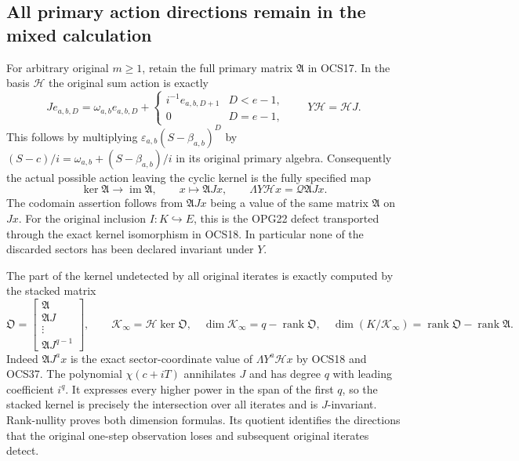 \documentclass[11pt,a4paper]{article}
\begin{document}
\subsection{All primary action directions remain in the mixed calculation}
For arbitrary original $m\geq1$, retain the full primary
matrix $\mathfrak A$ in OCS17. In the basis $\mathcal H$
the original sum action is exactly
\[
 J e_{a,b,D}=\omega_{a,b}e_{a,b,D}
       +\begin{cases}i^{-1}e_{a,b,D+1}&D<e-1,\\0&D=e-1,
         \end{cases}
 \qquad Y\mathcal H=\mathcal HJ.
 \tag{OCS37}
\]
This follows by multiplying
$\varepsilon_{a,b}(S-\beta_{a,b})^D$ by
$(S-c)/i=\omega_{a,b}+(S-\beta_{a,b})/i$ in its original
primary algebra. Consequently the actual possible action
leaving the cyclic kernel is the fully specified map
\[
 \ker\mathfrak A\longrightarrow\operatorname{im}\mathfrak A,
 \qquad x\longmapsto\mathfrak A Jx,
 \qquad
 \Lambda Y\mathcal Hx=\mathcal Q\mathfrak A Jx.
 \tag{OCS38}
\]
The codomain assertion follows from $\mathfrak A Jx$ being
a value of the same matrix $\mathfrak A$ on $Jx$.
For the original inclusion $I:K\hookrightarrow E$, this
is the OPG22 defect transported through the exact kernel
isomorphism in OCS18. In particular none of the discarded
sectors has been declared invariant under $Y$.

The part of the kernel undetected by all original iterates
is exactly computed by the stacked matrix
\[
 \mathfrak O=\begin{bmatrix}
          \mathfrak A\\\mathfrak AJ\\\vdots\\\mathfrak AJ^{q-1}
          \end{bmatrix},\qquad
 \mathcal K_\infty=\mathcal H\ker\mathfrak O,
 \quad
 \dim\mathcal K_\infty=q-\operatorname{rank}\mathfrak O,
 \quad
 \dim(K/\mathcal K_\infty)=
        \operatorname{rank}\mathfrak O-\operatorname{rank}\mathfrak A.
 \tag{OCS39}
\]
Indeed $\mathfrak A J^a x$ is the exact sector-coordinate
value of $\Lambda Y^a\mathcal Hx$ by OCS18 and OCS37.
The polynomial $\chi(c+iT)$ annihilates $J$ and has
degree $q$ with leading coefficient $i^q$. It expresses
every higher power in the span of the first $q$, so the
stacked kernel is precisely the intersection over all
iterates and is $J$-invariant. Rank-nullity proves both
dimension formulas. Its quotient identifies the directions
that the original one-step observation loses and subsequent
original iterates detect.
\end{document}
